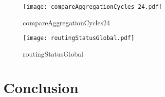 \documentclass[11pt,a4paper]{scrreprt}
\begin{document}
\begin{figure}[h!]
\centering
\texttt{[image: compareAggregationCycles\_24.pdf]}
\caption{compareAggregationCycles24}
\label{fig:compareAggregationCycles24}
\end{figure}

\begin{figure}[h!]
\centering
\texttt{[image: routingStatusGlobal.pdf]}
\caption{routingStatusGlobal}
\label{fig:routingStatusGlobal}
\end{figure}

\chapter{Conclusion}

\renewcommand\bibname{\chapter{References}}
\end{document}
